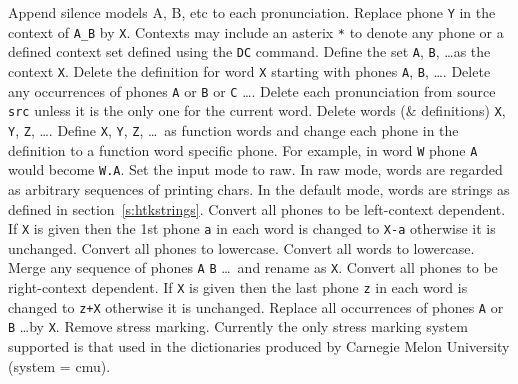 \begin{varlist}
     Append silence models A, B, etc to 
      each pronunciation.
    Replace phone \texttt{Y} in the context of \texttt{A\_B} 
             by \texttt{X}.  Contexts may include an asterix \texttt{*} to denote any 
             phone or a defined context set 
            defined using the \texttt{DC} command.
    Define the set \texttt{A}, \texttt{B}, \ldots as 
             the context \texttt{X}.
    Delete the definition for word \texttt{X} starting 
                              with phones \texttt{A}, \texttt{B}, \ldots.
    Delete any occurrences of phones \texttt{A} or 
               \texttt{B} or \texttt{C} \ldots.
            Delete each pronunciation from source \texttt{src} 
           unless it is the only one for the current word.
    Delete words (\& definitions) \texttt{X},
           \texttt{Y}, \texttt{Z}, \ldots.
    Define  \texttt{X},
           \texttt{Y}, \texttt{Z}, \ldots\ as function words and 
            change each phone 
           in the definition to a function word specific phone. For example,
           in word \texttt{W} phone \texttt{A} would become \texttt{W.A}.
     Set the input mode to raw.
          In raw mode, words are regarded as arbitrary sequences of printing
          chars.  In the default mode, words are strings as defined 
          in section~\ref{s:htkstrings}.
    Convert all phones to be left-context dependent. If \texttt{X} is given
          then the 1st phone \texttt{a} in each word is changed to \texttt{X-a} 
          otherwise it is unchanged.
    Convert all phones to lowercase.
    Convert all words to lowercase.
    Merge any sequence of phones \texttt{A} \texttt{B} 
          \ldots\ and rename as  \texttt{X}.
    Convert all phones to be right-context dependent. If 
          \texttt{X} is given  then the last phone \texttt{z} in each word is
          changed to \texttt{z+X} otherwise it is unchanged.
    Replace all occurrences of phones \texttt{A} 
       or \texttt{B} \ldots by \texttt{X}.
     Remove stress marking.  Currently the only 
         stress marking system 
       supported is that used in the dictionaries produced by 
       Carnegie Melon University (system = cmu).

\end{varlist}
